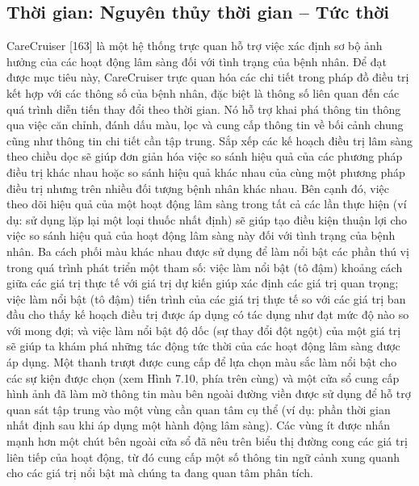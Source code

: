 \subsection{Thời gian: Nguyên thủy thời gian – Tức thời}
CareCruiser [163] là một hệ thống trực quan hỗ trợ việc xác định sơ bộ ảnh hưởng của các hoạt động lâm sàng đối với tình trạng của bệnh nhân. Để đạt được mục tiêu này, CareCruiser trực quan hóa các chi tiết trong pháp đồ điều trị kết hợp với các thông số của bệnh nhân, đặc biệt là thông số liên quan đến các quá trình diễn tiến thay đổi theo thời gian. Nó hỗ trợ khai phá thông tin thông qua việc căn chỉnh, đánh dấu màu, lọc và cung cấp thông tin về bối cảnh chung cũng như thông tin chi tiết cần tập trung. Sắp xếp các kế hoạch điều trị lâm sàng theo chiều dọc sẽ giúp đơn giản hóa việc so sánh hiệu quả của các phương pháp điều trị khác nhau hoặc so sánh hiệu quả khác nhau của cùng một phương pháp điều trị nhưng trên nhiều đối tượng bệnh nhân khác nhau. Bên cạnh đó, việc theo dõi hiệu quả của một hoạt động lâm sàng trong tất cả các lần thực hiện (ví dụ: sử dụng lặp lại một loại thuốc nhất định) sẽ giúp tạo điều kiện thuận lợi cho việc so sánh hiệu quả của hoạt động lâm sàng này đối với tình trạng của bệnh nhân. Ba cách phối màu khác nhau được sử dụng để làm nổi bật các phần thú vị trong quá trình phát triển một tham số: việc làm nổi bật (tô đậm) khoảng cách giữa các giá trị thực tế với giá trị dự kiến giúp xác định các giá trị quan trọng; việc làm nổi bật (tô đậm) tiến trình của các giá trị thực tế so với các giá trị ban đầu cho thấy kế hoạch điều trị được áp dụng có tác dụng như đạt mức độ nào so với mong đợi; và việc làm nổi bật độ dốc (sự thay đổi đột ngột) của một giá trị sẽ giúp ta khám phá những tác động tức thời của các hoạt động lâm sàng được áp dụng. Một thanh trượt được cung cấp để lựa chọn màu sắc làm nổi bật cho các sự kiện được chọn (xem Hình 7.10, phía trên cùng) và một cửa sổ cung cấp hình ảnh đã làm mờ thông tin màu bên ngoài đường viền được sử dụng để hỗ trợ quan sát tập trung vào một vùng cần quan tâm cụ thể (ví dụ: phần thời gian nhất định sau khi áp dụng một hành động lâm sàng). Các vùng ít được nhấn mạnh hơn một chút bên ngoài cửa sổ đã nêu trên biểu thị đường cong các giá trị liên tiếp của hoạt động, từ đó cung cấp một số thông tin ngữ cảnh xung quanh cho các giá trị nổi bật mà chúng ta đang quan tâm phân tích. 
